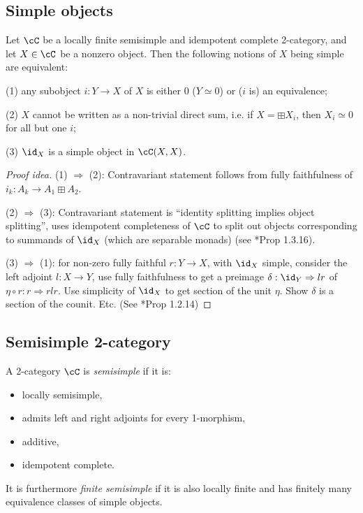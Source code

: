 \documentclass[12pt]{article}
\begin{document}
\subsection{Simple objects}


\begin{proposition}
Let $\cC$ be a locally finite semisimple and
idempotent complete 2-category,
and let $X \in \cC$ be a nonzero object.
Then the following notions of $X$ being simple are equivalent:

(1) any subobject $i: Y \to X$ of $X$
 is either 0 ($Y \simeq 0$)
 or ($i$ is) an equivalence;

(2) $X$ cannot be written as a non-trivial direct sum,
	i.e. if $X = \boxplus X_i$,
	then $X_i \simeq 0$ for all but one $i$;

(3) $\id_X$ is a simple object in $\cC(X,X)$.
\end{proposition}

\begin{proof}[Proof idea]
(1) $\Rightarrow$ (2): Contravariant statement
follows from fully faithfulness of
$i_k: A_k \to A_1 \boxplus A_2$.

(2) $\Rightarrow$ (3): Contravariant statement is
``identity splitting implies object splitting'',
uses idempotent completeness of $\cC$
to split out objects corresponding to summands of $\id_X$
(which are separable monads)
(see \cite{DRfusion}*{Prop 1.3.16}).

(3) $\Rightarrow$ (1): for non-zero fully faithful $r: Y \to X$,
with $\id_X$ simple,
consider the left adjoint $l: X \to Y$,
use fully faithfulness to get a preimage
$\delta : \id_Y \Rightarrow lr$ of
$\eta \circ r: r \Rightarrow rlr$.
Use simplicity of $\id_X$ to get section of the unit $\eta$.
Show $\delta$ is a section of the counit. Etc.
(See \cite{DRfusion}*{Prop 1.2.14})
\end{proof}


\subsection{Semisimple 2-category}

\begin{definition}
A 2-category $\cC$ is \emph{semisimple}
if it is:
\begin{itemize}
\item locally semisimple,
\item admits left and right adjoints for every 1-morphism,
\item additive,
\item idempotent complete.
\end{itemize}

It is furthermore \emph{finite semisimple}
if it is also locally finite and
has finitely many equivalence classes of simple objects.
\end{definition}
\end{document}
